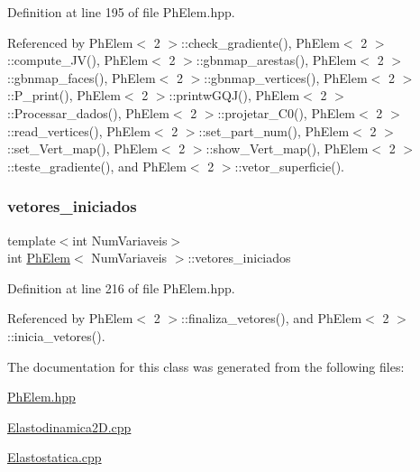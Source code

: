 Definition at line 195 of file Ph\+Elem.\+hpp.



Referenced by Ph\+Elem$<$ 2 $>$\+::check\+\_\+gradiente(), Ph\+Elem$<$ 2 $>$\+::compute\+\_\+\+J\+V(), Ph\+Elem$<$ 2 $>$\+::gbnmap\+\_\+arestas(), Ph\+Elem$<$ 2 $>$\+::gbnmap\+\_\+faces(), Ph\+Elem$<$ 2 $>$\+::gbnmap\+\_\+vertices(), Ph\+Elem$<$ 2 $>$\+::\+P\+\_\+print(), Ph\+Elem$<$ 2 $>$\+::printw\+G\+Q\+J(), Ph\+Elem$<$ 2 $>$\+::\+Processar\+\_\+dados(), Ph\+Elem$<$ 2 $>$\+::projetar\+\_\+\+C0(), Ph\+Elem$<$ 2 $>$\+::read\+\_\+vertices(), Ph\+Elem$<$ 2 $>$\+::set\+\_\+part\+\_\+num(), Ph\+Elem$<$ 2 $>$\+::set\+\_\+\+Vert\+\_\+map(), Ph\+Elem$<$ 2 $>$\+::show\+\_\+\+Vert\+\_\+map(), Ph\+Elem$<$ 2 $>$\+::teste\+\_\+gradiente(), and Ph\+Elem$<$ 2 $>$\+::vetor\+\_\+superficie().

\mbox{\label{classPhElem_a65f545dc1bf0d90240419934eb711a9d}} 
\subsubsection{\texorpdfstring{vetores\+\_\+iniciados}{vetores\_iniciados}}
{\footnotesize\ttfamily template$<$int Num\+Variaveis$>$ \\
int \hyperlink{classPhElem}{Ph\+Elem}$<$ Num\+Variaveis $>$\+::vetores\+\_\+iniciados\hspace{0.3cm}{\ttfamily [protected]}}



Definition at line 216 of file Ph\+Elem.\+hpp.



Referenced by Ph\+Elem$<$ 2 $>$\+::finaliza\+\_\+vetores(), and Ph\+Elem$<$ 2 $>$\+::inicia\+\_\+vetores().



The documentation for this class was generated from the following files\+:\begin{DoxyCompactItemize}
\item 
\hyperlink{PhElem_8hpp}{Ph\+Elem.\+hpp}\item 
\hyperlink{Elastodinamica2D_8cpp}{Elastodinamica2\+D.\+cpp}\item 
\hyperlink{Elastostatica_8cpp}{Elastostatica.\+cpp}\end{DoxyCompactItemize}
